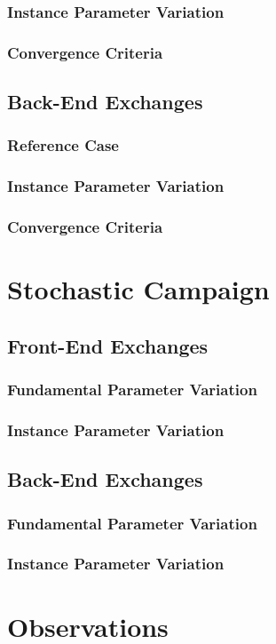 \subsubsection{Instance Parameter Variation}

\subsubsection{Convergence Criteria}

\subsection{Back-End Exchanges}

\subsubsection{Reference Case}

\subsubsection{Instance Parameter Variation}

\subsubsection{Convergence Criteria}

\section{Stochastic Campaign}

\subsection{Front-End Exchanges}

\subsubsection{Fundamental Parameter Variation}

\subsubsection{Instance Parameter Variation}

\subsection{Back-End Exchanges}

\subsubsection{Fundamental Parameter Variation}

\subsubsection{Instance Parameter Variation}

\section{Observations}
